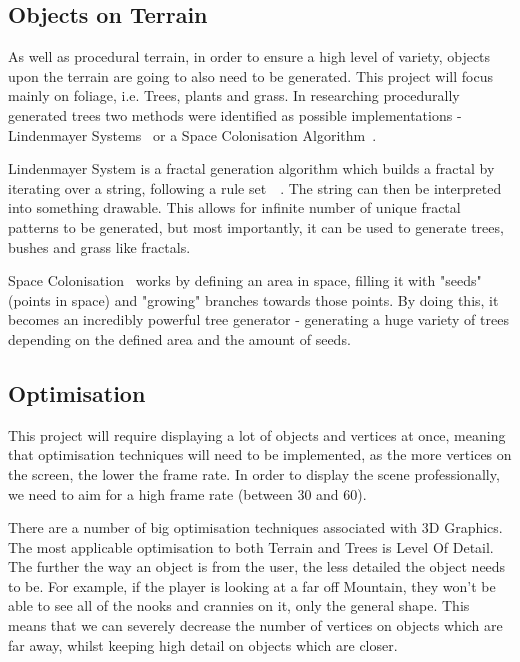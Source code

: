 \documentclass[a4paper,10pt]{report}
\begin{document}
\subsection{Objects on Terrain}

As well as procedural terrain, in order to ensure a high level of variety, objects upon the terrain are going to also need to be generated. This project will focus mainly on foliage, i.e. Trees, plants and grass. In researching procedurally generated trees two methods were identified as possible implementations - Lindenmayer Systems~\cite{lindenmayer2017} or a Space Colonisation Algorithm~\cite{runions2007modeling}. 

Lindenmayer System is a fractal generation algorithm which builds a fractal by iterating over a string, following a rule set~\cite{prusinkiewicz2012algorithmic}~\cite{crownover1995introduction}. The string can then be interpreted into something drawable. This allows for infinite number of unique fractal patterns to be generated, but most importantly, it can be used to generate trees, bushes and grass like fractals.  

Space Colonisation~\cite{runions2007modeling} works by defining an area in space, filling it with "seeds" (points in space) and "growing" branches towards those points. By doing this, it becomes an incredibly powerful tree generator - generating a huge variety of trees depending on the defined area and the amount of seeds.

\subsection{Optimisation}
This project will require displaying a lot of objects and vertices at once, meaning that optimisation techniques will need to be implemented, as the more vertices on the screen, the lower the frame rate. In order to display the scene professionally, we need to aim for a high frame rate (between 30 and 60).  \medskip

There are a number of big optimisation techniques associated with 3D Graphics. The most applicable optimisation to both Terrain and Trees is Level Of Detail. The further the way an object is from the user, the less detailed the object needs to be. For example, if the player is looking at a far off Mountain, they won't be able to see all of the nooks and crannies on it, only the general shape. This means that we can severely decrease the number of vertices on objects which are far away, whilst keeping high detail on objects which are closer. \medskip
\end{document}
